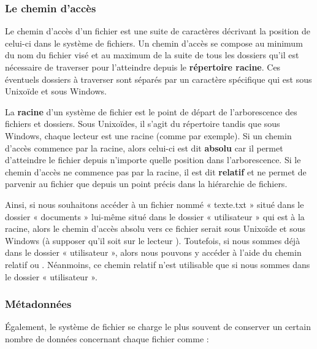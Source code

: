 \subsubsection{Le chemin d'accès}
\label{le-chemin-dacces}

Le chemin d'accès d'un fichier est une suite de caractères décrivant la
position de celui-ci dans le système de fichiers. Un chemin d'accès se
compose au minimum du nom du fichier visé et au maximum de la suite de
tous les dossiers qu'il est nécessaire de traverser pour l'atteindre
depuis le \textbf{répertoire racine}. Ces éventuels dossiers à traverser
sont séparés par un caractère spécifique qui est \mybox{/} sous
Unixoïde et \mybox{\textbackslash{}} sous Windows.

La \textbf{racine} d'un système de fichier est le point de départ de
l'arborescence des fichiers et dossiers. Sous Unixoïdes, il s'agit du
répertoire \mybox{/} tandis que sous Windows, chaque lecteur est une
racine (comme  par exemple). Si un chemin d'accès commence
par la racine, alors celui-ci est dit \textbf{absolu} car il permet
d'atteindre le fichier depuis n'importe quelle position dans
l'arborescence. Si le chemin d'accès ne commence pas par la racine, il
est dit \textbf{relatif} et ne permet de parvenir au fichier que depuis
un point précis dans la hiérarchie de fichiers.

Ainsi, si nous souhaitons accéder à un fichier nommé « texte.txt » situé
dans le dossier « documents » lui-même situé dans le dossier «
utilisateur » qui est à la racine, alors le chemin d'accès absolu vers
ce fichier serait  sous
Unixoïde et
sous Windows (à supposer qu'il soit sur le lecteur ).
Toutefois, si nous sommes déjà dans le dossier « utilisateur », alors
nous pouvons y accéder à l'aide du chemin relatif
 ou
. Néanmoins, ce chemin
relatif n'est utilisable que si nous sommes dans le dossier «
utilisateur ».

\subsubsection{Métadonnées}
\label{metadonnees}

Également, le système de fichier se charge le plus souvent de conserver
un certain nombre de données concernant chaque fichier comme :

